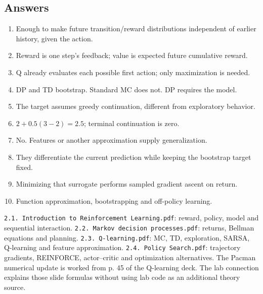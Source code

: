 \documentclass[11pt]{article}
\begin{document}
\subsection{Answers}
\begin{enumerate}
\item Enough to make future transition/reward distributions independent of earlier history, given the action.
\item Reward is one step's feedback; value is expected future cumulative reward.
\item Q already evaluates each possible first action; only maximization is needed.
\item DP and TD bootstrap. Standard MC does not. DP requires the model.
\item The target assumes greedy continuation, different from exploratory behavior.
\item $2+0.5(3-2)=2.5$; terminal continuation is zero.
\item No. Features or another approximation supply generalization.
\item They differentiate the current prediction while keeping the bootstrap target fixed.
\item Minimizing that surrogate performs sampled gradient ascent on return.
\item Function approximation, bootstrapping and off-policy learning.
\end{enumerate}
\texttt{2.1. Introduction to Reinforcement Learning.pdf}: reward, policy, model and sequential interaction. \texttt{2.2. Markov decision processes.pdf}: returns, Bellman equations and planning. \texttt{2.3. Q-learning.pdf}: MC, TD, exploration, SARSA, Q-learning and feature approximation. \texttt{2.4. Policy Search.pdf}: trajectory gradients, REINFORCE, actor--critic and optimization alternatives. The Pacman numerical update is worked from p. 45 of the Q-learning deck. The lab connection explains those slide formulas without using lab code as an additional theory source.
\end{document}

